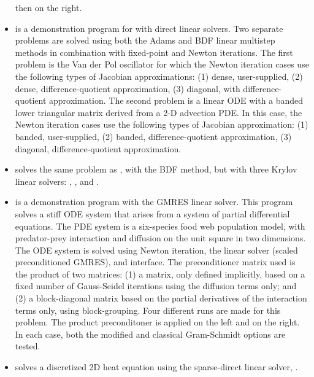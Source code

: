 \begin{itemize}
  then on the right.
\item {}
  is a demonstration program for {\cvode} with direct linear solvers.
  \newline
  Two separate problems are solved using both the Adams and BDF linear
  multistep methods in combination with fixed-point and Newton
  iterations.
  \newline
  The first problem is the Van der Pol oscillator for which
  the Newton iteration cases use the following types of Jacobian approximations:
  (1) dense, user-supplied, (2) dense, difference-quotient approximation,
  (3) diagonal, with difference-quotient approximation. The second
  problem is a linear ODE with a
  banded lower triangular matrix derived from a 2-D advection PDE. In this
  case, the Newton iteration cases use the following types of Jacobian
  approximation: (1) banded, user-supplied, (2) banded, difference-quotient
  approximation, (3) diagonal, difference-quotient approximation.
\item {}
  solves the same problem as , with the BDF method, but with
  three Krylov linear solvers: {\sunlinsolspgmr}, {\sunlinsolspbcgs},
  and {\sunlinsolsptfqmr}.
\item {}
  is a demonstration program with the GMRES linear solver.
  \newline
  This program solves a stiff ODE system that arises from a system
  of partial differential equations.  The PDE system is a six-species
  food web population model, with predator-prey interaction and diffusion
  on the unit square in two dimensions.
  \newline
  The ODE system is solved using Newton iteration, the
  {\sunlinsolspgmr} linear solver (scaled preconditioned GMRES), and
  {\cvspils} interface.
  \newline
  The preconditioner matrix used is the product of two matrices:
  (1) a matrix, only defined implicitly, based on a fixed number of
  Gauss-Seidel iterations using the diffusion terms only; and
  (2) a block-diagonal matrix based on the partial derivatives of the
  interaction terms only, using block-grouping.
  \newline
  Four different runs are made for this problem.
  The product preconditoner is applied on the left and on the right.
  In each case, both the modified and classical Gram-Schmidt options
  are tested.
\item {} solves a discretized 2D heat equation using
  the {\klu} sparse-direct linear solver, {\sunlinsolklu}.
\end{itemize}

